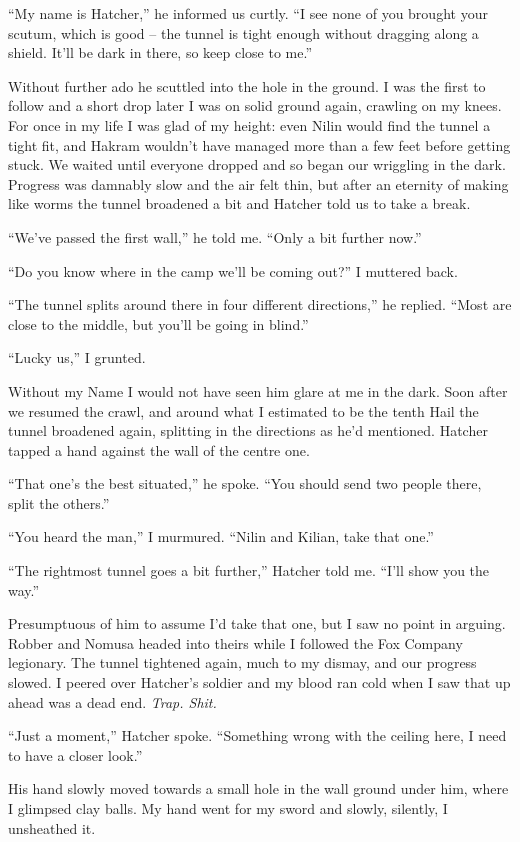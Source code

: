 \documentclass[12pt, openany]{book}
\begin{document}
“My name is Hatcher,” he informed us curtly. “I see none of you brought your scutum, which is good – the tunnel is tight enough without dragging along a shield. It’ll be dark in there, so keep close to me.”

Without further ado he scuttled into the hole in the ground. I was the first to follow and a short drop later I was on solid ground again, crawling on my knees. For once in my life I was glad of my height: even Nilin would find the tunnel a tight fit, and Hakram wouldn’t have managed more than a few feet before getting stuck. We waited until everyone dropped and so began our wriggling in the dark. Progress was damnably slow and the air felt thin, but after an eternity of making like worms the tunnel broadened a bit and Hatcher told us to take a break.

“We’ve passed the first wall,” he told me. “Only a bit further now.”

“Do you know where in the camp we’ll be coming out?” I muttered back.

“The tunnel splits around there in four different directions,” he replied. “Most are close to the middle, but you’ll be going in blind.”

“Lucky us,” I grunted.

Without my Name I would not have seen him glare at me in the dark. Soon after we resumed the crawl, and around what I estimated to be the tenth Hail the tunnel broadened again, splitting in the directions as he’d mentioned. Hatcher tapped a hand against the wall of the centre one.

“That one’s the best situated,” he spoke. “You should send two people there, split the others.”

“You heard the man,” I murmured. “Nilin and Kilian, take that one.”

“The rightmost tunnel goes a bit further,” Hatcher told me. “I’ll show you the way.”

Presumptuous of him to assume I’d take that one, but I saw no point in arguing. Robber and Nomusa headed into theirs while I followed the Fox Company legionary. The tunnel tightened again, much to my dismay, and our progress slowed. I peered over Hatcher’s soldier and my blood ran cold when I saw that up ahead was a dead end. \textit{Trap. Shit.}

“Just a moment,” Hatcher spoke. “Something wrong with the ceiling here, I need to have a closer look.”

His hand slowly moved towards a small hole in the wall ground under him, where I glimpsed clay balls. My hand went for my sword and slowly, silently, I unsheathed it.
\end{document}
